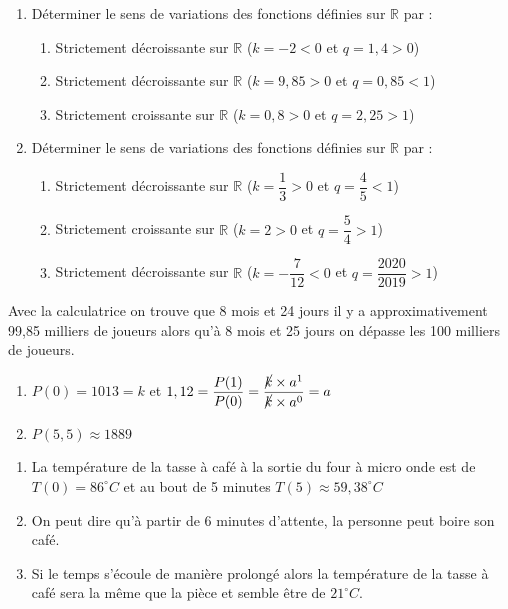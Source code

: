 \documentclass[french]{book}
\begin{document}
\begin{corrige}

\begin{enumerate}
\item Déterminer le sens de variations des fonctions définies sur $\mathbb{R}$ par :
\begin{enumerate}

\item Strictement décroissante sur $\mathbb{R}$ ($k=-2<0$ et $q=1,4>0$)
\item Strictement décroissante sur $\mathbb{R}$ ($k=9,85>0$ et $q=0,85<1$)
\item Strictement croissante sur $\mathbb{R}$ ($k=0,8>0$ et $q=2,25>1$)

\end{enumerate}

\item Déterminer le sens de variations des fonctions définies sur $\mathbb{R}$ par :
\begin{enumerate}

\item Strictement décroissante sur $\mathbb{R}$ ($k=\dfrac{1}{3}>0$ et $q=\dfrac{4}{5}<1$)
\item Strictement croissante sur $\mathbb{R}$ ($k=2>0$ et $q=\dfrac{5}{4}>1$)
\item Strictement décroissante sur $\mathbb{R}$ ($k=-\dfrac{7}{12}<0$ et $q=\dfrac{2020}{2019}>1$)

\end{enumerate}
\end{enumerate}
\end{corrige}

\begin{corrige}
Avec la calculatrice on trouve que 8 mois et 24 jours il y a approximativement 99,85 milliers de joueurs alors qu'à 8 mois et 25 jours on dépasse les 100 milliers de joueurs. 
\end{corrige}

\begin{corrige}
\begin{enumerate}
\item $P(0)=1013=k$ et $1,12=\dfrac{P(1)}{P(0)}=\dfrac{\cancel{k}\times a^1}{\cancel{k} \times a^0}=a$
\item $P(5,5) \approx 1889 $
\end{enumerate}
\end{corrige}

\begin{corrige}
\begin{enumerate}
\item La température de la tasse à café à la sortie du four à micro onde est de $T(0)=86^{\circ} C$ et au bout de 5 minutes $T(5) \approx 59,38^{\circ} C$
\item On peut dire qu'à partir de 6 minutes d'attente, la personne peut boire son café. 
\item Si le temps s'écoule de manière prolongé alors la température de la tasse à café sera la même que la pièce et semble être de $21^{\circ} C$.
\end{enumerate}
\end{corrige}
\end{document}
